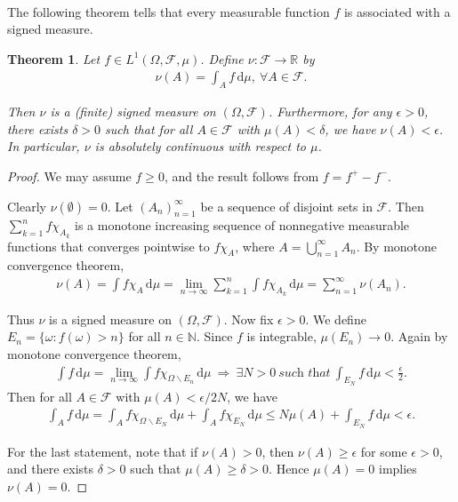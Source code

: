 \documentclass{article}
\numberwithin{equation}{section}
\renewcommand{\d}{\mathrm{d}}
\theoremstyle{plain}
\newtheorem{theorem}{Theorem}[section]
\theoremstyle{definition}
\begin{document}
\paragraph{} The following theorem tells that every measurable function $f$ is associated with a signed measure.

\begin{theorem}\label{thm:1.57} Let $f\in L^1(\Omega,\mathscr{F},\mu)$. Define $\nu:\mathscr{F}\to\mathbb{R}$ by
\begin{align*}
	\nu(A)=\int_A f\,\d \mu,\ \forall A\in\mathscr{F}.
\end{align*}

Then $\nu$ is a (finite) signed measure on $(\Omega,\mathscr{F})$. Furthermore, for any $\epsilon>0$, there exists $\delta>0$ such that for all $A\in\mathscr{F}$ with $\mu(A)<\delta$, we have $\nu(A)<\epsilon$. In particular, $\nu$ is absolutely continuous with respect to $\mu$.
\end{theorem}
\begin{proof}
We may assume $f\geq 0$, and the result follows from $f=f^+-f^-$.

Clearly $\nu(\emptyset)=0$. Let $(A_n)_{n=1}^\infty$ be a sequence of disjoint sets in $\mathscr{F}$. Then $\sum_{k=1}^n f\chi_{A_k}$ is a monotone increasing sequence of nonnegative measurable functions that converges pointwise to $f\chi_A$, where $A=\bigcup_{n=1}^\infty A_n$. By monotone convergence theorem,
\begin{align*}
	\nu(A) = \int f\chi_A\,\d \mu = \lim_{n\to\infty}\sum_{k=1}^n\int f\chi_{A_k}\,\d \mu = \sum_{n=1}^\infty\nu(A_n).
\end{align*}

Thus $\nu$ is a signed measure on $(\Omega,\mathscr{F})$. Now fix $\epsilon>0$. We define $E_n=\{\omega:f(\omega)>n\}$ for all $n\in\mathbb{N}$. Since $f$ is integrable, $\mu(E_n)\to 0$. Again by monotone convergence theorem,
\begin{align*}
	\int f\,\d \mu = \lim_{n\to\infty}\int f\chi_{\Omega\backslash E_n}\,\d \mu\ \Rightarrow\ \exists N>0\ \textit{such that}\ \int_{E_N} f\,\d \mu < \frac{\epsilon}{2}.
\end{align*}
Then for all $A\in\mathscr{F}$ with $\mu(A)<\epsilon/2N$, we have \begin{align*}
	\int_A f\,\d \mu = \int_A f\chi_{\Omega\backslash E_N}\,\d \mu + \int_A f\chi_{E_N}\,\d \mu \leq N\mu(A) + \int_{E_N}f\,\d \mu < \epsilon.
\end{align*}

For the last statement, note that if $\nu(A)>0$, then $\nu(A)\geq\epsilon$ for some $\epsilon>0$, and there exists $\delta>0$ such that $\mu(A)\geq\delta>0$. Hence $\mu(A)=0$ implies $\nu(A)=0$.
\end{proof}
\end{document}
